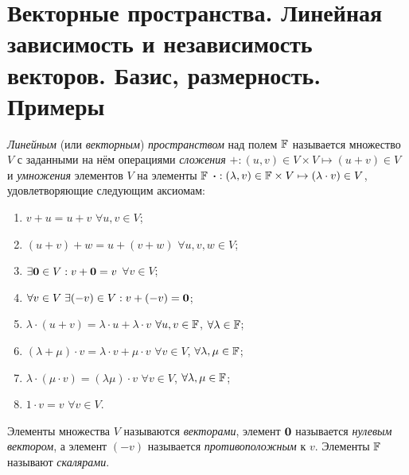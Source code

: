 \section{Векторные пространства. Линейная зависимость и независимость векторов. Базис, размерность. Примеры}

\begin{definition}
    \textit{Линейным} (или \textit{векторным}) \textit{пространством} над полем $\mathbb{F}$ называется множество $V$ с заданными на нём операциями \textit{сложения} $+: (u, v) \in V \times V \mapsto (u + v) \in V$ и \textit{умножения} элементов $V$ на элементы $\mathbb{F}$ $\boldsymbol{\cdot}: (\lambda, v) \in \mathbb{F} \times V \mapsto (\lambda \cdot v) \in V$, удовлетворяющие следующим аксиомам:
    \begin{enumerate}
        \item $v + u = u + v$ $\forall u, v \in V$;
        \item $(u + v) + w = u + (v + w)$ $\forall u, v, w \in V$;
        \item $\exists \boldsymbol{0} \in V: v + \boldsymbol{0} = v$ $\forall v \in V$;\hspace{2.9cm}
        \item $\forall v \in V\;\exists (-v) \in V: v + (-v) = \boldsymbol{0}$;
        \item $\lambda \cdot (u + v) = \lambda \cdot u + \lambda \cdot v$ $\forall u, v \in \mathbb{F}$, $\forall \lambda \in \mathbb{F}$;
        \item $(\lambda + \mu) \cdot v = \lambda \cdot v + \mu \cdot v$ $\forall v \in V$, $\forall \lambda, \mu \in \mathbb{F}$;
        \item $\lambda \cdot (\mu \cdot v) = (\lambda\mu) \cdot v$ $\forall v \in V$, $\forall \lambda, \mu \in \mathbb{F}$;\hspace{1cm}
        \item $1 \cdot v = v$ $\forall v \in V$.
    \end{enumerate}
\end{definition}

\begin{definition}
    Элементы множества $V$ называются \textit{векторами}, элемент $\boldsymbol{0}$ называется \textit{нулевым вектором}, а элемент $(-v)$ называется \textit{противоположным} к $v$. Элементы $\mathbb{F}$ называют \textit{скалярами}.
\end{definition}

